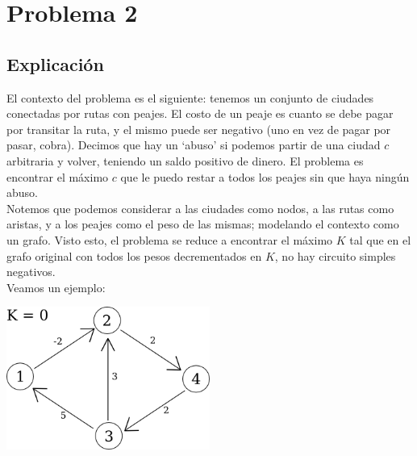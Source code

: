 
\section{Problema 2}

\subsection{Explicación}

El contexto del problema es el siguiente: tenemos un conjunto de ciudades conectadas por rutas con peajes. El costo de un peaje es cuanto se debe pagar por transitar la ruta, y el mismo puede ser negativo (uno en vez de pagar por pasar, cobra). Decimos que hay un `abuso' si podemos partir de una ciudad $c$ arbitraria y volver, teniendo un saldo positivo de dinero. El problema es encontrar el máximo $c$ que le puedo restar a todos los peajes sin que haya ningún abuso. \\

Notemos que podemos considerar a las ciudades como nodos, a las rutas como aristas, y a los peajes como el peso de las mismas; modelando el contexto como un grafo. Visto esto, el problema se reduce a encontrar el máximo $K$ tal que en el grafo original con todos los pesos decrementados en $K$, no hay circuito simples negativos. \\

Veamos un ejemplo: \\

\vspace{0.1cm}

{\centering
  \includegraphics[width=0.50\textwidth]{imagenes/problema2/prob2_caso3.png} \\
}
$ $\newline

